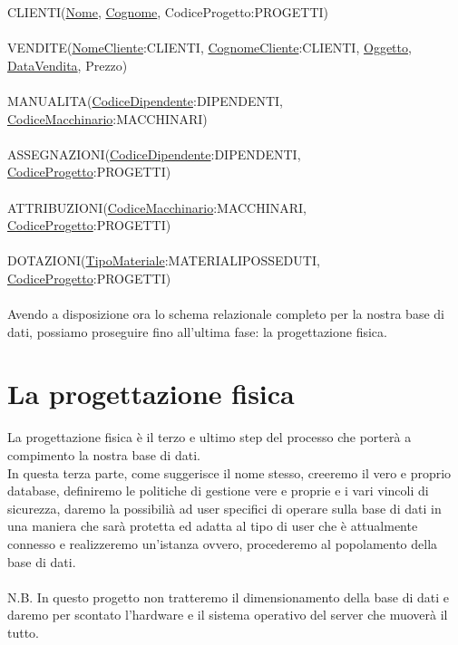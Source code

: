 \documentclass[a4paper,12pt,italian]{article}
\begin{document}
CLIENTI(\underline{Nome}, \underline{Cognome}, CodiceProgetto:PROGETTI) \\ \\
VENDITE(\underline{NomeCliente}:CLIENTI, \underline{CognomeCliente}:CLIENTI, \underline{Oggetto}, \underline{DataVendita}, Prezzo) \\ \\
MANUALITA(\underline{CodiceDipendente}:DIPENDENTI, \underline{CodiceMacchinario}:MACCHINARI) \\ \\
ASSEGNAZIONI(\underline{CodiceDipendente}:DIPENDENTI, \underline{CodiceProgetto}:PROGETTI) \\ \\
ATTRIBUZIONI(\underline{CodiceMacchinario}:MACCHINARI, \underline{CodiceProgetto}:PROGETTI) \\ \\
DOTAZIONI(\underline{TipoMateriale}:MATERIALIPOSSEDUTI, \underline{CodiceProgetto}:PROGETTI) \\ \\
Avendo a disposizione ora lo schema relazionale completo per la nostra base di dati, possiamo proseguire fino all'ultima fase: la progettazione fisica.

\section{La progettazione fisica}
La progettazione fisica è il terzo e ultimo step del processo che porterà a compimento la nostra base di dati. \\ In questa terza parte, come suggerisce il nome stesso, creeremo il vero e proprio database, definiremo le politiche di gestione vere e proprie e i vari vincoli di sicurezza, daremo la possibilià ad user specifici di operare sulla base di dati in una maniera che sarà protetta ed adatta al tipo di user che è attualmente connesso e realizzeremo un'istanza ovvero, procederemo al popolamento della base di dati. \\ \\
N.B. In questo progetto non tratteremo il dimensionamento della base di dati e daremo per scontato l'hardware e il sistema operativo del server che muoverà il tutto.
\end{document}
